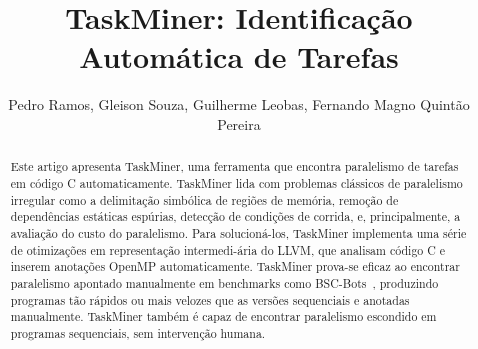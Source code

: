\documentclass[sigconf]{acmart}
\newcommand\Taskminer{\mbox{\textsf{TaskMiner}}}
\begin{document}
\title[TaskMiner: Identifica\c{c}\~{a}o Autom\'{a}tica de Tarefas]
{TaskMiner: Identificação Automática de Tarefas}



\author{Pedro Ramos, Gleison Souza, Guilherme Leobas, Fernando Magno Quint\~{a}o Pereira}




\begin{abstract}
Este artigo apresenta \Taskminer{}, uma ferramenta que encontra paralelismo de tarefas
em código C automaticamente. \Taskminer{} lida com problemas clássicos de paralelismo irregular 
como a delimitação simbólica de regiões de memória, remoção de dependências
estáticas espúrias, detecção de condições de corrida, e, principalmente, a avaliação do custo do paralelismo. Para solucioná-los,
\Taskminer{} implementa uma série de otimizações em representa\-ção intermedi-ária do LLVM, que analisam código C e inserem anotações OpenMP automaticamente. \Taskminer{} prova-se eficaz ao encontrar paralelismo apontado manualmente em benchmarks como \textsf{BSC-Bots}~\cite{Duran09}, produzindo programas tão rápidos ou mais velozes que as versões sequenciais e anotadas manualmente. \Taskminer{} também é capaz de encontrar paralelismo escondido em programas sequenciais, sem intervenção humana.
\end{abstract}
\end{document}
